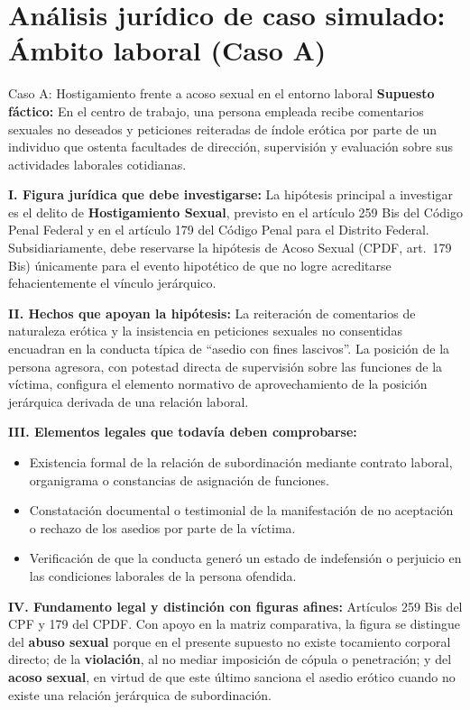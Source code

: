 \documentclass[spanish,letterpaper,oneside]{article}
\begin{document}
\section{Análisis jurídico de caso simulado: Ámbito laboral (Caso A)}
\begin{casoestudio}{Caso A: Hostigamiento frente a acoso sexual en el entorno laboral}
\textbf{Supuesto fáctico:} En el centro de trabajo, una persona empleada recibe comentarios sexuales no deseados y peticiones reiteradas de índole erótica por parte de un individuo que ostenta facultades de dirección, supervisión y evaluación sobre sus actividades laborales cotidianas.

\textbf{I. Figura jurídica que debe investigarse:}
La hipótesis principal a investigar es el delito de \textbf{Hostigamiento Sexual}, previsto en el artículo 259 Bis del Código Penal Federal y en el artículo 179 del Código Penal para el Distrito Federal. Subsidiariamente, debe reservarse la hipótesis de Acoso Sexual (CPDF, art.~179 Bis) únicamente para el evento hipotético de que no logre acreditarse fehacientemente el vínculo jerárquico.

\textbf{II. Hechos que apoyan la hipótesis:}
La reiteración de comentarios de naturaleza erótica y la insistencia en peticiones sexuales no consentidas encuadran en la conducta típica de ``asedio con fines lascivos''. La posición de la persona agresora, con potestad directa de supervisión sobre las funciones de la víctima, configura el elemento normativo de aprovechamiento de la posición jerárquica derivada de una relación laboral.

\textbf{III. Elementos legales que todavía deben comprobarse:}
\begin{itemize}[leftmargin=*,topsep=1pt,itemsep=1pt]
\item Existencia formal de la relación de subordinación mediante contrato laboral, organigrama o constancias de asignación de funciones.
\item Constatación documental o testimonial de la manifestación de no aceptación o rechazo de los asedios por parte de la víctima.
\item Verificación de que la conducta generó un estado de indefensión o perjuicio en las condiciones laborales de la persona ofendida.
\end{itemize}

\textbf{IV. Fundamento legal y distinción con figuras afines:}
Artículos 259 Bis del CPF y 179 del CPDF. Con apoyo en la matriz comparativa, la figura se distingue del \textbf{abuso sexual} porque en el presente supuesto no existe tocamiento corporal directo; de la \textbf{violación}, al no mediar imposición de cópula o penetración; y del \textbf{acoso sexual}, en virtud de que este último sanciona el asedio erótico cuando no existe una relación jerárquica de subordinación.
\end{casoestudio}
\end{document}
